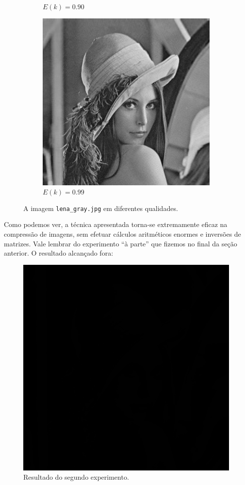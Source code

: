 \documentclass[a4paper,12pt]{article}
\begin{document}
\begin{figure}[!htb]
\begin{subfigure}[b]{0.2\linewidth}
    \caption{$E(k) = 0.90$}
\end{subfigure} \hspace{0.5cm}
\begin{subfigure}[b]{0.2\linewidth}
    \includegraphics[width=\linewidth]{img/lena_99.jpg}
    \caption{$E(k) = 0.99$}
\end{subfigure}
\caption{A imagem \texttt{lena\_gray.jpg} em diferentes qualidades.}
\end{figure}
\FloatBarrier

Como podemos ver, a técnica apresentada torna-se extremamente eficaz na compressão de imagens, sem efetuar cálculos aritméticos enormes e inversões de matrizes. Vale lembrar do experimento ``à parte'' que fizemos no final da seção anterior. O resultado alcançado fora:
\begin{figure}[h!]
    \centering
    \includegraphics[width=0.4\linewidth]{img/lena_E20_ultimosVS}
    \caption{Resultado do segundo experimento.}
\end{figure}
\end{document}
